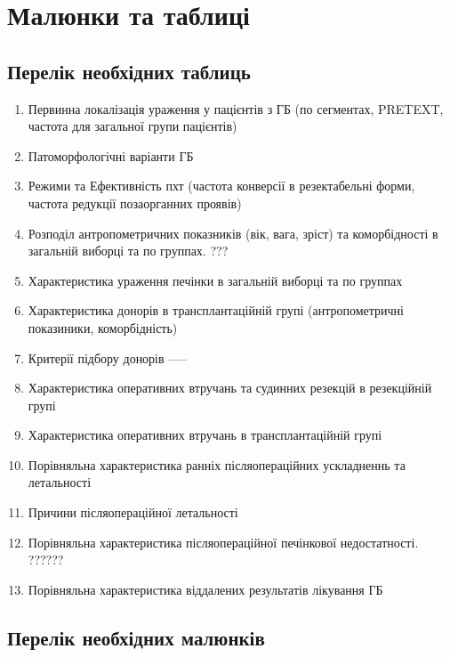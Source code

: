 \chapter{Малюнки та таблиці}

\section{Перелік необхідних таблиць}

\begin{enumerate}
    
    \item Первинна локалізація ураження у пацієнтів з ГБ (по сегментах, PRETEXT, частота для загальної групи пацієнтів) 
    \item Патоморфологічні варіанти ГБ 
    \item Режими та Ефективність пхт (частота конверсії в резектабельні форми, частота редукції позаорганних проявів) 
    \item Розподіл антропометричних показників (вік, вага, зріст) та коморбідності в загальній виборці та по группах.  ???
    \item Характеристика ураження печінки в загальній виборці та по группах 
    \item Характеристика донорів в трансплантаційній групі (антропометричні показиники, коморбідність) 
    \item Критерії підбору донорів -----
    \item Характеристика оперативних втручань та судинних резекцій в резекційній групі 
    \item Характеристика оперативних втручань в трансплантаційній групі 
    \item Порівняльна характеристика ранніх післяопераційних ускладненнь та летальності 
    \item Причини післяопераційної летальності
    \item Порівняльна характеристика післяопераційної печінкової недостатності. ??????
    \item Порівняльна характеристика віддалених результатів лікування ГБ 
    
\end{enumerate}

\section{Перелік необхідних малюнків}


